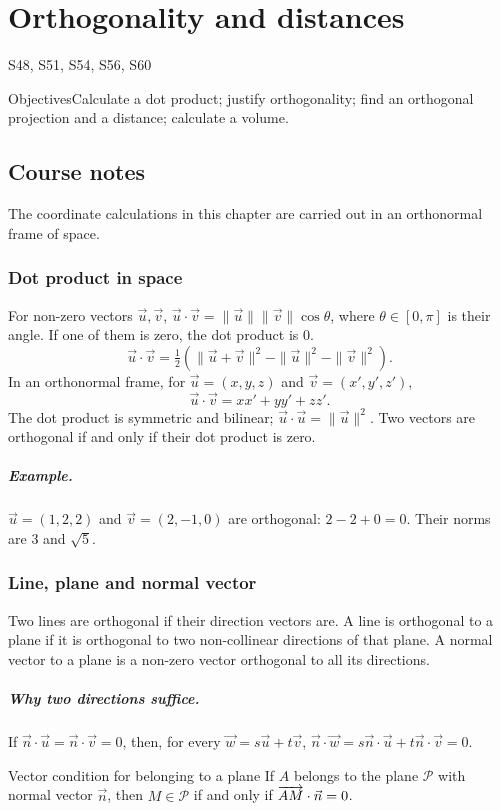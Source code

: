 \setcounter{chapter}{10}\chapter{Orthogonality and distances}\label{ch:11}

{\small\sffamily\color{teal}S48, S51, S54, S56, S60\par}

\begin{retenir}{Objectives}Calculate a dot product; justify orthogonality; find an orthogonal projection and a distance; calculate a volume.\end{retenir}

\section{Course notes}
The coordinate calculations in this chapter are carried out in an orthonormal frame of space.
\subsection{Dot product in space}
For non-zero vectors $\vec u,\vec v$, $\vec u\cdot\vec v=\|\vec u\|\|\vec v\|\cos\theta$, where $\theta\in[0,\pi]$ is their angle. If one of them is zero, the dot product is $0$.
\[\vec u\cdot\vec v=\tfrac12(\|\vec u+\vec v\|^2-\|\vec u\|^2-\|\vec v\|^2).
\]
In an orthonormal frame, for $\vec u=(x,y,z)$ and $\vec v=(x',y',z')$,
\[\vec u\cdot\vec v=xx'+yy'+zz'.\]
The dot product is symmetric and bilinear; $\vec u\cdot\vec u=\|\vec u\|^2$. Two vectors are orthogonal if and only if their dot product is zero.
\paragraph{Example.} $\vec u=(1,2,2)$ and $\vec v=(2,-1,0)$ are orthogonal: $2-2+0=0$. Their norms are $3$ and $\sqrt5$.
\subsection{Line, plane and normal vector}
Two lines are orthogonal if their direction vectors are. A line is orthogonal to a plane if it is orthogonal to two non-collinear directions of that plane. A normal vector to a plane is a non-zero vector orthogonal to all its directions.
\paragraph{Why two directions suffice.} If $\vec n\cdot\vec u=\vec n\cdot\vec v=0$, then, for every $\vec w=s\vec u+t\vec v$, $\vec n\cdot\vec w=s\vec n\cdot\vec u+t\vec n\cdot\vec v=0$.
\begin{retenir}{Vector condition for belonging to a plane}
If $A$ belongs to the plane $\mathcal P$ with normal vector $\vec n$, then $M\in\mathcal P$ if and only if $\overrightarrow{AM}\cdot\vec n=0$.
\end{retenir}
